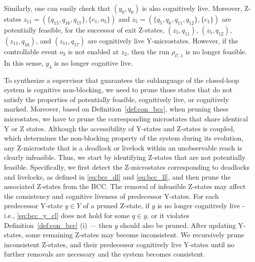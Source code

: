 \documentclass[journal,twoside,web]{ieeecolor}
\begin{document}
\begin{example}
    Similarly, one can easily check that $(y_0, q_0)$ is also cognitively live.
    Moreover, Z-states $z_{11} = (\{ q_{15}, q_{16}, q_{17}\}, \{c_1, o_3\})$ and $z_5 = (\{q_5, q_6, q_{11}, q_{12}\}, \{ c_1 \})$ are potentially feasible, for the successor of exit Z-states, $(z_5, q_{11})$, $(z_5, q_{12})$, $(z_{11}, q_{16})$, and $(z_{11}, q_{17})$ are cognitively live Y-microstates.
    However, if the controllable event $o_3$ is not enabled at $z_2$, then the run $\rho_{\mathcal{C}, 1}$ is no longer feasible.
    In this sense, $y_4$ is no longer cognitive live.
\end{example}

%
%
%
To synthesize a supervisor that guarantees the sublanguage of the closed-loop system is cognitive non-blocking, we need to prune those states that do not satisfy the properties of potentially feasible, cognitively live, or cognitively marked.
Moreover, based on Definition~\ref{def:con_bcc}, when pruning these microstates, we have to prune the corresponding microstates that share identical Y or Z states.
%
Although the accessibility of Y-states and Z-states is coupled, which determines the non-blocking property of the system during its evolution, 
any Z-microstate that is a deadlock or livelock within an unobservable reach is clearly infeasible. 
Thus, we start by identifying Z-states that are not potentially feasible. 
Specifically, we first detect the Z-microstates corresponding to deadlocks and livelocks, as defined in \eqref{eq:bcc_dl} and \eqref{eq:bcc_ll}, and then prune the associated Z-states from the BCC.
%
The removal of infeasible Z-states may affect the consistency and cognitive liveness of predecessor Y-states. 
For each predecessor Y-state $y \in Y$ of a pruned Z-state, 
if $y$ is no longer cognitively live -i.e., \eqref{eq:bcc_y_cl} does not hold for some $q \in y$, or it violates Definition~\ref{def:con_bcc} (i) — then $y$ should also be pruned.
%
After updating Y-states, some remaining Z-states may become inconsistent. 
We recursively prune inconsistent Z-states, and their predecessor cognitively live Y-states until no further removals are necessary and the system becomes consistent. 
\end{document}
